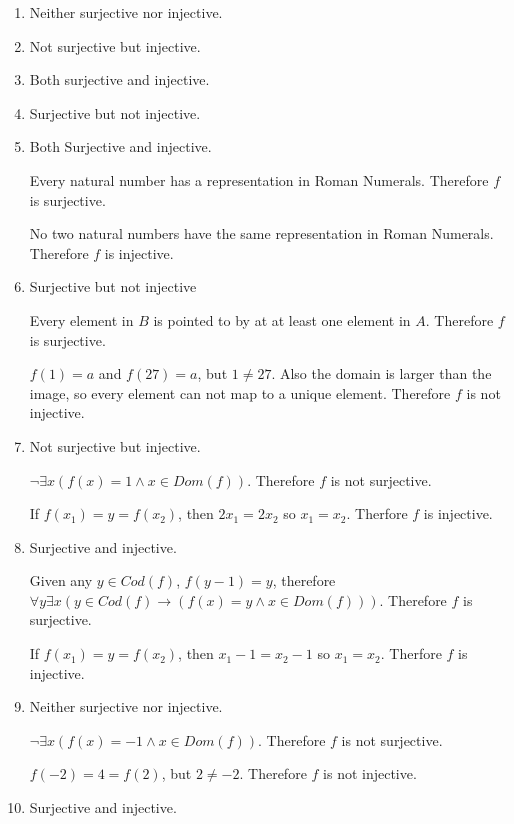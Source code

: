 \documentclass[12pt,letterpaper]{article}
\newcommand{\lif}{\rightarrow}
\begin{document}
\begin{enumerate}
\item {Neither surjective nor injective.}

\item {Not surjective but injective.}

\item {Both surjective and injective.}

\item {Surjective but not injective.}

\item {Both Surjective and injective.

Every natural number has a representation in Roman Numerals. Therefore $f$ is surjective.

No two natural numbers have the same representation in Roman Numerals. Therefore $f$ is injective.
}

\item {Surjective but not injective

Every element in $B$ is pointed to by at at least one element in $A$. Therefore $f$ is surjective.

$f(1) = a$ and $f(27) = a$, but $1 \neq 27$. Also the domain is larger than the image, so every element can not map to a unique element. Therefore $f$ is not injective.
}

\item {Not surjective but injective.

$\neg \exists x (f(x) = 1 \land x \in Dom(f))$. Therefore $f$ is not surjective.

If $f(x_1) = y = f(x_2)$, then $2 x_1 = 2 x_2$ so $x_1 = x_2$. Therfore $f$ is injective.
}

\item {Surjective and injective.

Given any $y \in Cod(f)$, $f(y - 1) = y$, therefore $\forall y \exists x (y \in Cod(f) \lif (f(x) = y \land x \in Dom(f)))$. Therefore $f$ is surjective.

If $f(x_1) = y = f(x_2)$, then $x_1 - 1 = x_2 - 1$ so $x_1 = x_2$. Therfore $f$ is injective.
}

\item {Neither surjective nor injective.

$\neg \exists x (f(x) = -1 \land x \in Dom(f))$. Therefore $f$ is not surjective.

$f(-2) = 4 = f(2)$, but $2 \neq -2$. Therefore $f$ is not injective.
}

\item {Surjective and injective.

}
\end{enumerate}
\end{document}
